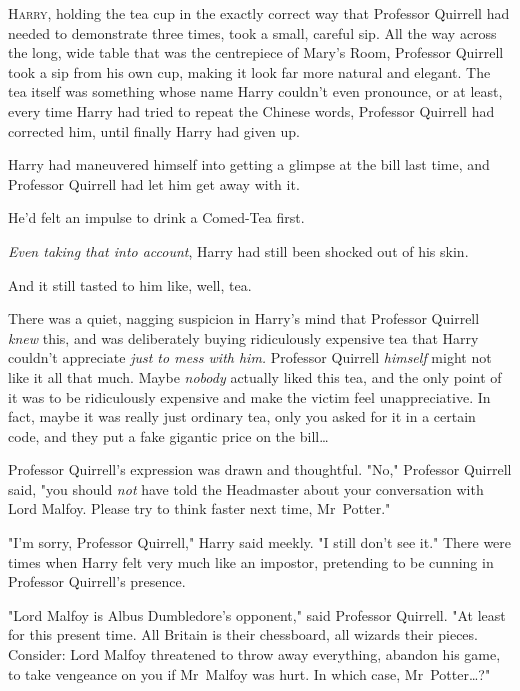 
\lettrine{H}{arry}, holding
the tea cup in the exactly correct way that Professor Quirrell had needed to
demonstrate three times, took a small, careful sip. All the way across the
long, wide table that was the centrepiece of Mary's Room, Professor Quirrell
took a sip from his own cup, making it look far more natural and elegant. The
tea itself was something whose name Harry couldn't even pronounce, or at least,
every time Harry had tried to repeat the Chinese words, Professor Quirrell had
corrected him, until finally Harry had given up.

Harry had maneuvered himself into getting a glimpse at the bill last time, and
Professor Quirrell had let him get away with it.

He'd felt an impulse to drink a Comed-Tea first.

\emph{Even taking that into account}, Harry had still been shocked out of his
skin.

And it still tasted to him like, well, tea.

There was a quiet, nagging suspicion in Harry's mind that Professor Quirrell
\emph{knew} this, and was deliberately buying ridiculously expensive tea that
Harry couldn't appreciate \emph{just to mess with him.} Professor Quirrell
\emph{himself} might not like it all that much. Maybe \emph{nobody} actually
liked this tea, and the only point of it was to be ridiculously expensive and
make the victim feel unappreciative. In fact, maybe it was really just ordinary
tea, only you asked for it in a certain code, and they put a fake gigantic
price on the bill{\ldots}

Professor Quirrell's expression was drawn and thoughtful. "No," Professor
Quirrell said, "you should \emph{not} have told the Headmaster about your
conversation with Lord Malfoy. Please try to think faster next time,
Mr~Potter."

"I'm sorry, Professor Quirrell," Harry said meekly. "I still don't see it."
There were times when Harry felt very much like an impostor, pretending to be
cunning in Professor Quirrell's presence.

"Lord Malfoy is Albus Dumbledore's opponent," said Professor Quirrell. "At
least for this present time. All Britain is their chessboard, all wizards their
pieces. Consider: Lord Malfoy threatened to throw away everything, abandon his
game, to take vengeance on you if Mr~Malfoy was hurt. In which case,
Mr~Potter{\ldots}?"

